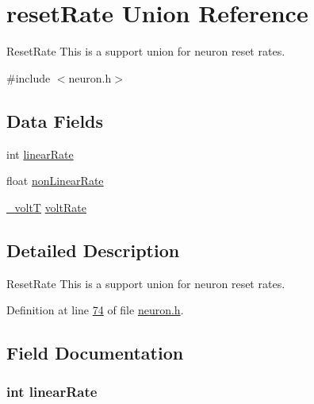 \hypertarget{unionreset_rate}{}\section{reset\+Rate Union Reference}
\label{unionreset_rate}


Reset\+Rate This is a support union for neuron reset rates.  




{\ttfamily \#include $<$neuron.\+h$>$}

\subsection*{Data Fields}
\begin{DoxyCompactItemize}
\item 
int \hyperlink{unionreset_rate_a4bf8a23e4a9874ff73208c681eae1ced}{linear\+Rate}
\item 
float \hyperlink{unionreset_rate_a54aaba14ce85fd9c5d7b385d98727e36}{non\+Linear\+Rate}
\item 
\hyperlink{assist_8h_abe1fc1b8f9efd1187e564bcb8de7f815}{\+\_\+volt\+T} \hyperlink{unionreset_rate_a5a9af6c017d8b70e4db9283f2f7e726b}{volt\+Rate}
\end{DoxyCompactItemize}


\subsection{Detailed Description}
Reset\+Rate This is a support union for neuron reset rates. 



Definition at line \hyperlink{neuron_8h_source_l00074}{74} of file \hyperlink{neuron_8h_source}{neuron.\+h}.



\subsection{Field Documentation}
\hypertarget{unionreset_rate_a4bf8a23e4a9874ff73208c681eae1ced}{}
\subsubsection[{linear\+Rate}]{\setlength{\rightskip}{0pt plus 5cm}int linear\+Rate}\label{unionreset_rate_a4bf8a23e4a9874ff73208c681eae1ced}


